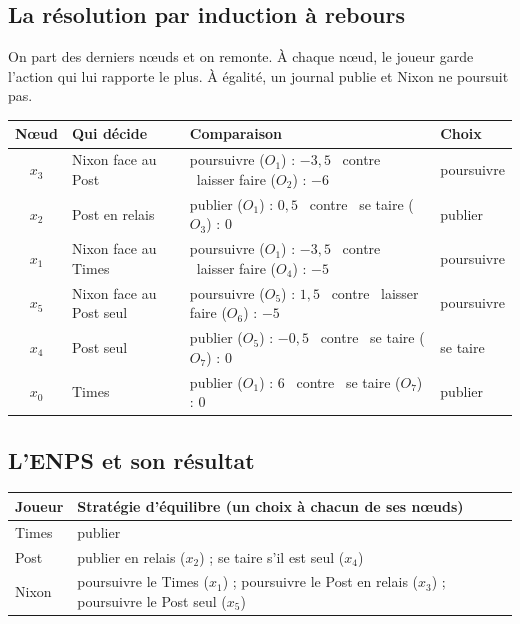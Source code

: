 \documentclass[11pt,a4paper]{article}
\theoremstyle{definition}
\newcommand{\T}[1]{\textcolor{nyt}{#1}}
\newcommand{\W}[1]{\textcolor{wp}{#1}}
\newcommand{\N}[1]{\textcolor{gov}{#1}}
\begin{document}
\subsection{La résolution par induction à rebours}
On part des derniers nœuds et on remonte. À chaque nœud, le joueur garde l'action qui lui rapporte le plus. À égalité, un journal publie et Nixon ne poursuit pas.
\begin{center}
\small
\begin{tabular}{@{}clll@{}}
\toprule
Nœud & Qui décide & Comparaison & Choix \\
\midrule
$x_3$ & \N{Nixon} face au Post & poursuivre ($O_1$) : $-3{,}5$ \ contre \ laisser faire ($O_2$) : $-6$ & poursuivre \\
$x_2$ & \W{Post} en relais & publier ($O_1$) : $0{,}5$ \ contre \ se taire ($O_3$) : $0$ & publier \\
$x_1$ & \N{Nixon} face au Times & poursuivre ($O_1$) : $-3{,}5$ \ contre \ laisser faire ($O_4$) : $-5$ & poursuivre \\
$x_5$ & \N{Nixon} face au Post seul & poursuivre ($O_5$) : $1{,}5$ \ contre \ laisser faire ($O_6$) : $-5$ & poursuivre \\
$x_4$ & \W{Post} seul & publier ($O_5$) : $-0{,}5$ \ contre \ se taire ($O_7$) : $0$ & se taire \\
$x_0$ & \T{Times} & publier ($O_1$) : $6$ \ contre \ se taire ($O_7$) : $0$ & publier \\
\bottomrule
\end{tabular}
\end{center}

\subsection{L'ENPS et son résultat}
\begin{center}
\small
\begin{tabular}{@{}ll@{}}
\toprule
Joueur & Stratégie d'équilibre (un choix à chacun de ses nœuds) \\
\midrule
\T{Times} & publier \\
\W{Post} & publier en relais ($x_2$) ; se taire s'il est seul ($x_4$) \\
\N{Nixon} & poursuivre le Times ($x_1$) ; poursuivre le Post en relais ($x_3$) ; poursuivre le Post seul ($x_5$) \\
\bottomrule
\end{tabular}
\end{center}
\end{document}

